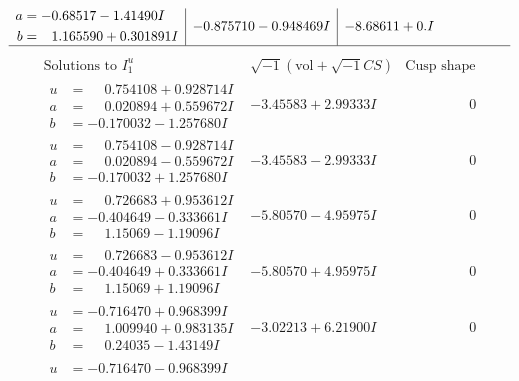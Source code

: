 \documentclass[1p]{elsarticle_modified}
\theoremstyle{definition}
\newcommand{\I}{\sqrt{-1}}
\begin{document}
$$\begin{array}{c|c|c}
\begin{aligned}
a &= -0.68517 - 1.41490 I \\
b &= \phantom{-}1.165590 + 0.301891 I\end{aligned}
 & -0.875710 - 0.948469 I & -8.68611 + 0. I\phantom{ +0.000000I}\\
 \hline 
 \end{array}$$\newpage$$\begin{array}{c|c|c}  
\text{Solutions to }I^u_{1}& \I (\text{vol} + \sqrt{-1}CS) & \text{Cusp shape}\\
 \hline 
\begin{aligned}
u &= \phantom{-}0.754108 + 0.928714 I \\
a &= \phantom{-}0.020894 + 0.559672 I \\
b &= -0.170032 - 1.257680 I\end{aligned}
 & -3.45583 + 2.99333 I & \phantom{-0.000000 } 0 \\ \hline\begin{aligned}
u &= \phantom{-}0.754108 - 0.928714 I \\
a &= \phantom{-}0.020894 - 0.559672 I \\
b &= -0.170032 + 1.257680 I\end{aligned}
 & -3.45583 - 2.99333 I & \phantom{-0.000000 } 0 \\ \hline\begin{aligned}
u &= \phantom{-}0.726683 + 0.953612 I \\
a &= -0.404649 - 0.333661 I \\
b &= \phantom{-}1.15069 - 1.19096 I\end{aligned}
 & -5.80570 - 4.95975 I & \phantom{-0.000000 } 0 \\ \hline\begin{aligned}
u &= \phantom{-}0.726683 - 0.953612 I \\
a &= -0.404649 + 0.333661 I \\
b &= \phantom{-}1.15069 + 1.19096 I\end{aligned}
 & -5.80570 + 4.95975 I & \phantom{-0.000000 } 0 \\ \hline\begin{aligned}
u &= -0.716470 + 0.968399 I \\
a &= \phantom{-}1.009940 + 0.983135 I \\
b &= \phantom{-}0.24035 - 1.43149 I\end{aligned}
 & -3.02213 + 6.21900 I & \phantom{-0.000000 } 0 \\ \hline\begin{aligned}
u &= -0.716470 - 0.968399 I \\

\end{aligned}
\end{array}$$
\end{document}
